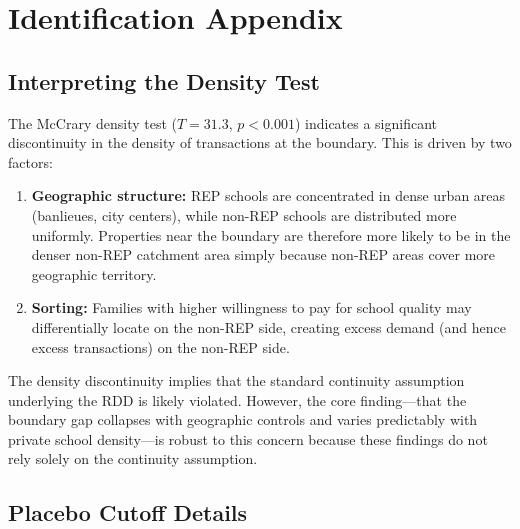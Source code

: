 \documentclass[12pt]{article}
\begin{document}
\section{Identification Appendix}\label{app:identification}

\subsection{Interpreting the Density Test}

The McCrary density test ($T = 31.3$, $p < 0.001$) indicates a significant discontinuity in the density of transactions at the boundary. This is driven by two factors:

\begin{enumerate}
\item \textbf{Geographic structure:} REP schools are concentrated in dense urban areas (banlieues, city centers), while non-REP schools are distributed more uniformly. Properties near the boundary are therefore more likely to be in the denser non-REP catchment area simply because non-REP areas cover more geographic territory.

\item \textbf{Sorting:} Families with higher willingness to pay for school quality may differentially locate on the non-REP side, creating excess demand (and hence excess transactions) on the non-REP side.
\end{enumerate}

The density discontinuity implies that the standard continuity assumption underlying the RDD is likely violated. However, the core finding---that the boundary gap collapses with geographic controls and varies predictably with private school density---is robust to this concern because these findings do not rely solely on the continuity assumption.

\subsection{Placebo Cutoff Details}
\end{document}
